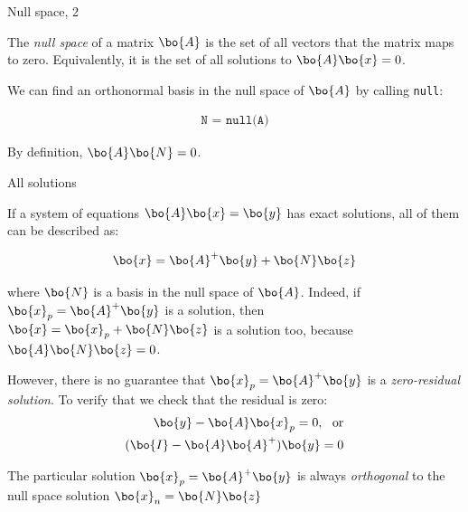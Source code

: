 \documentclass{beamer}
\begin{document}
\begin{frame}{Null space, 2}
	\begin{flushleft}
		
		The \emph{null space}  of a matrix $\bo{A}$ is the set of all vectors that the matrix maps to zero. Equivalently, it is the set of all solutions to $\bo{A}\bo{x} = 0$.
		
		\bigskip
		
		We can find an orthonormal basis in the null space of $\bo{A}$ by calling \texttt{null}:
		
		\begin{align*}
			\texttt{N = null(A)}
		\end{align*} 
		
		By definition, $\bo{A}\bo{N} = 0$.
		
	\end{flushleft}
\end{frame}





\begin{frame}{All solutions}
	\begin{flushleft}
		
		If a system of equations $\bo{A}\bo{x} = \bo{y}$ has exact solutions, all of them can be described as:
		
		\begin{equation}
			\bo{x} = \bo{A}^+\bo{y} + \bo{N}\bo{z}
		\end{equation}
		
		where $\bo{N}$ is a basis in the null space of $\bo{A}$. Indeed, if $\bo{x}_p = \bo{A}^+\bo{y}$ is a solution, then $\bo{x} = \bo{x}_p + \bo{N}\bo{z}$ is a solution too, because $\bo{A}\bo{N}\bo{z} = 0$.
		
		\bigskip
		
		However, there is no guarantee that $\bo{x}_p = \bo{A}^+\bo{y}$ is a \emph{zero-residual solution}. To verify that we check that the residual is zero:
		\begin{align}
			 \bo{y} - \bo{A}\bo{x}_p = 0, \ \ \text{or}
			 \\
			 (\bo{I} - \bo{A}\bo{A}^+)\bo{y} = 0
		\end{align}
		
		\bigskip
		
		The particular solution $\bo{x}_p = \bo{A}^+\bo{y}$ is always \emph{orthogonal} to the null space solution $\bo{x}_n = \bo{N}\bo{z}$
		
	\end{flushleft}
\end{frame}
\end{document}
